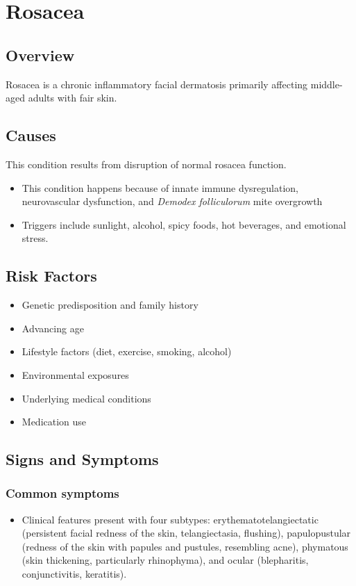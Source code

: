 \chapter{Rosacea}
\label{sec:Rosacea}

\section{Overview}
Rosacea is a chronic inflammatory facial dermatosis primarily affecting middle-aged adults with fair skin.
\section{Causes}
This condition results from disruption of normal rosacea function.

\begin{itemize}[noitemsep]
  \item This condition happens because of innate immune dysregulation, neurovascular dysfunction, and \textit{Demodex folliculorum} mite overgrowth
  \item Triggers include sunlight, alcohol, spicy foods, hot beverages, and emotional stress.
\end{itemize}
\section{Risk Factors}


\begin{itemize}[noitemsep]
  \item Genetic predisposition and family history
  \item Advancing age
  \item Lifestyle factors (diet, exercise, smoking, alcohol)
  \item Environmental exposures
  \item Underlying medical conditions
  \item Medication use
\end{itemize}
\section{Signs and Symptoms}

\subsection{Common symptoms}
\begin{itemize}[noitemsep]
  \item Clinical features present with four subtypes: erythematotelangiectatic (persistent facial redness of the skin, telangiectasia, flushing), papulopustular (redness of the skin with papules and pustules, resembling acne), phymatous (skin thickening, particularly rhinophyma), and ocular (blepharitis, conjunctivitis, keratitis). 
  \end{itemize}

